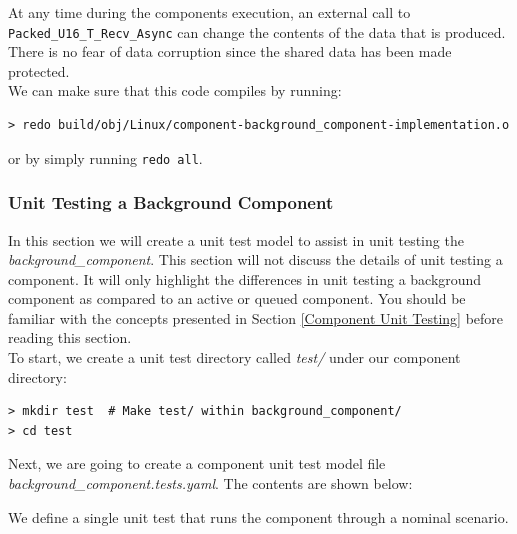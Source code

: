 At any time during the components execution, an external call to \texttt{Packed\_U16\_T\_Recv\_Async} can change the contents of the data that is produced. There is no fear of data corruption since the shared data has been made protected. \\

We can make sure that this code compiles by running:

\vspace{5mm} %
\begin{verbatim}
> redo build/obj/Linux/component-background_component-implementation.o
\end{verbatim}
\vspace{5mm} %

or by simply running \texttt{redo all}. \\

\subsubsection{Unit Testing a Background Component}

In this section we will create a unit test model to assist in unit testing the \textit{background\_component}. This section will not discuss the details of unit testing a component. It will only highlight the differences in unit testing a background component as compared to an active or queued component. You should be familiar with the concepts presented in Section \ref{Component Unit Testing} before reading this section. \\

To start, we create a unit test directory called \textit{test/} under our component directory:

\vspace{5mm} %
\begin{verbatim}
> mkdir test  # Make test/ within background_component/
> cd test
\end{verbatim}
\vspace{5mm} %

Next, we are going to create a component unit test model file \textit{background\_component.tests.yaml}. The contents are shown below:


We define a single unit test that runs the component through a nominal scenario. \\


